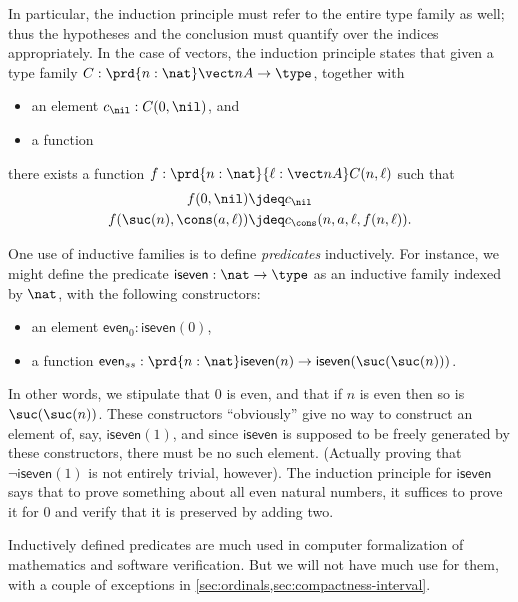 In particular, the induction principle must refer to the entire type family as well; thus the hypotheses and the conclusion must quantify over the indices appropriately.
In the case of vectors, the induction principle states that given a type family $C:\prd{n:\nat} \vect n A \to \type$, together with
\begin{itemize}
\item an element $c_\nil : C(0,\nil)$, and
\item a function 
\end{itemize}
there exists a function $f:\prd{n:\nat}{\ell:\vect n A} C(n,\ell)$ such that
\begin{align*}
  f(0,\nil) &\jdeq c_\nil\\
  f(\suc(n),\cons(a,\ell)) &\jdeq c_\cons(n,a,\ell,f(n,\ell)).
\end{align*}

%
%
One use of inductive families is to define \emph{predicates} inductively.
For instance, we might define the predicate $\mathsf{iseven}:\nat\to\type$ as an inductive family indexed by $\nat$, with the following constructors:
\begin{itemize}
\item an element $\mathsf{even}_0 : \mathsf{iseven}(0)$,
\item a function $\mathsf{even}_{ss} : \prd{n:\nat} \mathsf{iseven}(n) \to \mathsf{iseven}(\suc(\suc(n)))$.
\end{itemize}
In other words, we stipulate that $0$ is even, and that if $n$ is even then so is $\suc(\suc(n))$.
These constructors ``obviously'' give no way to construct an element of, say, $\mathsf{iseven}(1)$, and since $\mathsf{iseven}$ is supposed to be freely generated by these constructors, there must be no such element.
(Actually proving that $\neg \mathsf{iseven}(1)$ is not entirely trivial, however).
The induction principle for $\mathsf{iseven}$ says that to prove something about all even natural numbers, it suffices to prove it for $0$ and verify that it is preserved by adding two.

%
Inductively defined predicates are much used in computer formalization of mathematics and software verification.
But we will not have much use for them, with a couple of exceptions in \autoref{sec:ordinals,sec:compactness-interval}.

